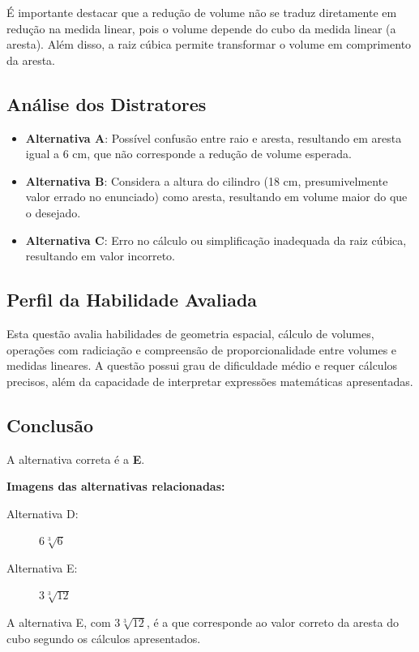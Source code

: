 \documentclass{article}
\begin{document}
É importante destacar que a redução de volume não se traduz diretamente em redução na medida linear, pois o volume depende do cubo da medida linear (a aresta). Além disso, a raiz cúbica permite transformar o volume em comprimento da aresta.

\subsection*{Análise dos Distratores}
\begin{itemize}
  \item \textbf{Alternativa A}: Possível confusão entre raio e aresta, resultando em aresta igual a 6 cm, que não corresponde a redução de volume esperada.
  \item \textbf{Alternativa B}: Considera a altura do cilindro (18 cm, presumivelmente valor errado no enunciado) como aresta, resultando em volume maior do que o desejado.
  \item \textbf{Alternativa C}: Erro no cálculo ou simplificação inadequada da raiz cúbica, resultando em valor incorreto.
\end{itemize}

\subsection*{Perfil da Habilidade Avaliada}
Esta questão avalia habilidades de geometria espacial, cálculo de volumes, operações com radiciação e compreensão de proporcionalidade entre volumes e medidas lineares. A questão possui grau de dificuldade médio e requer cálculos precisos, além da capacidade de interpretar expressões matemáticas apresentadas.

\subsection*{Conclusão}
A alternativa correta é a \textbf{E}.

\bigskip

\textbf{Imagens das alternativas relacionadas:}

\begin{description}
  \item[Alternativa D:] $6 \sqrt[3]{6}$
  \item[Alternativa E:] $3 \sqrt[3]{12}$
\end{description}

A alternativa E, com $3 \sqrt[3]{12}$, é a que corresponde ao valor correto da aresta do cubo segundo os cálculos apresentados.
\end{document}
